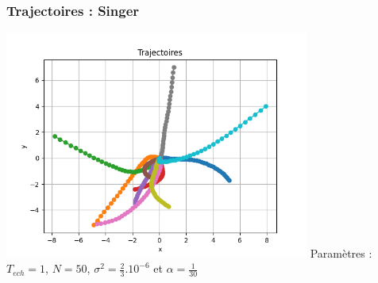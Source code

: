 \documentclass{beamer}
\begin{document}
\begin{frame}
  \frametitle{Trajectoires : Singer}
  \includegraphics[width=0.75\textwidth]{images/SINGER_Trajectoires.png}
  Paramètres : $T_{ech} = 1$, $N = 50$, $\sigma^{2} = \frac{2}{3}.10^{-6}$ et $\alpha = \frac{1}{30}$
\end{frame}
\end{document}
